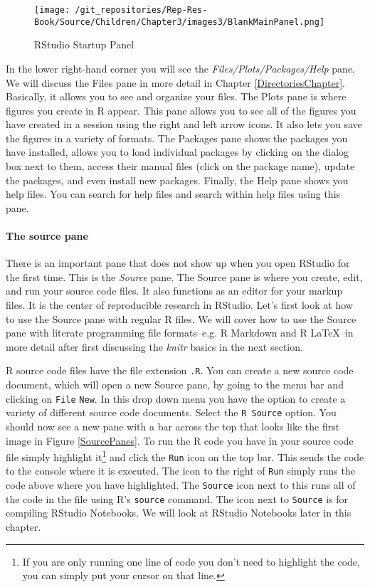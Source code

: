 \begin{figure}[ht]
    \caption{RStudio Startup Panel}
    \label{BlankMain}
    \begin{center}
    \texttt{[image: /git\_repositories/Rep-Res-Book/Source/Children/Chapter3/images3/BlankMainPanel.png]}
    \end{center}
\end{figure}

In the lower right-hand corner you will see the {\emph{Files/Plots/Packages/Help}} pane. We will discuss the Files pane in more detail in Chapter \ref{DirectoriesChapter}. Basically, it allows you to see and organize your files. The Plots pane is where figures you create in R appear. This pane allows you to see all of the figures you have created in a session using the right and left arrow icons. It also lets you save the figures in a variety of formats. The Packages pane shows the packages you have installed, allows you to load individual packages by clicking on the dialog box next to them, access their manual files (click on the package name), update the packages, and even install new packages. Finally, the Help pane shows you help files. You can search for help files and search within help files using this pane.  

\paragraph{The source pane}

There is an important pane that does not show up when you open RStudio for the first time. This is the {\emph{Source}} pane. The Source pane is where you create, edit, and run your source code files. It also functions as an editor for your markup files. It is the center of reproducible research in RStudio. Let's first look at how to use the Source pane with regular R files. We will cover how to use the Source pane with literate programming file formats--e.g. R Markdown and R LaTeX--in more detail after first discussing the {\emph{knitr}} basics in the next section. 

R source code files have the file extension \texttt{.R}. You can create a new source code document, which will open a new Source pane, by going to the menu bar and clicking on \texttt{File} \textrightarrow \: \texttt{New}. In this drop down menu you have the option to create a variety of different source code documents. Select the \texttt{R Source} option. You should now see a new pane with a bar across the top that looks like the first image in Figure \ref{SourcePanes}. To run the R code you have in your source code file simply highlight it\footnote{If you are only running one line of code you don't need to highlight the code, you can simply put your cursor on that line.} and click the \texttt{Run} icon on the top bar. This sends the code to the console where it is executed. The icon to the right of \texttt{Run} simply runs the code above where you have highlighted. The \texttt{Source} icon next to this runs all of the code in the file using R's \texttt{source} command. The icon next to \texttt{Source} is for compiling RStudio Notebooks. We will look at RStudio Notebooks later in this chapter.

